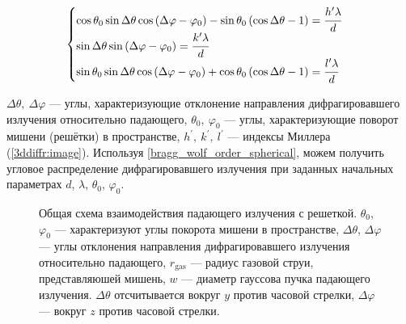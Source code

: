     \begin{equation}
        \begin{cases}
            \cos{\theta_0}\sin{\Delta \theta}\cos{\left( \Delta \varphi - \varphi_0 \right)} - \sin{\theta_0} \left( \cos{\Delta \theta} - 1 \right) = \cfrac{h^{\prime} \lambda}{d}
            \\
            \sin{\Delta \theta} \sin{\left( \Delta \varphi - \varphi_0 \right)} = \cfrac{k^{\prime} \lambda}{d}
            \\
            \sin{\theta_0}\sin{\Delta \theta}\cos{\left( \Delta \varphi - \varphi_0 \right)} + \cos{\theta_0} \left( \cos{\Delta \theta} - 1 \right)= \cfrac{l^{\prime} \lambda}{d}
        \end{cases}
        \label{bragg_wolf_order_spherical}
    \end{equation}

 $\Delta \theta,\:\Delta \varphi$ --- углы, характеризующие отклонение направления дифрагировавшего излучения относительно падающего, $\theta_0,\:\varphi_0$ --- углы, характеризующие поворот мишени (решётки) в пространстве, $h^\prime,\:k^\prime,\:l^\prime$ --- индексы Миллера (\autoref{3ddiffr:image}). Используя \autoref{bragg_wolf_order_spherical}, можем получить угловое распределение дифрагировавшего излучения при заданных начальных параметрах $d$, $\lambda$, $\theta_0$, $\varphi_0$. 

    \begin{figure}[H]
        \hfil
        \caption{Общая схема взаимодействия падающего излучения с решеткой. $\theta_0$, $\varphi_0$ --- характеризуют углы покорота мишени в пространстве, $\Delta \theta$, $\Delta \varphi$ --- углы отклонения направления дифрагировавшего излучения относительно падающего, $r_{\textrm{gas}}$ --- радиус газовой струи, представляюшей мишень, $w$ --- диаметр гауссова пучка падающего излучения. $\Delta \theta$ отсчитывается вокруг $y$ против часовой стрелки, $\Delta \varphi$ --- вокруг $z$ против часовой стрелки.}\label{3ddiffr:image}
    \end{figure}



